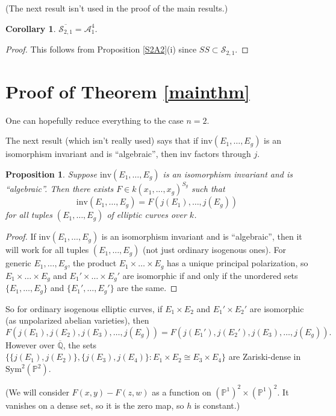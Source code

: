 \documentclass{amsart}
\def\Q{\mathbb{Q}}
\def\SS{{\mathcal S}}
\def\P{\mathbb{P}}
\def\AA{{\mathcal A}}
\def\Sym{\mathrm{Sym}}
\def\invar{\mathrm{inv}}
\numberwithin{equation}{section}
\newtheorem{cor}[thm]{Corollary}
\newtheorem{prop}[thm]{Proposition}
\theoremstyle{definition}
\begin{document}
(The next result isn't used in the proof of the main results.)

\begin{cor}
\label{SS21A14}
$\overline{\SS_{2,1}} = \AA_1^4$.
\end{cor}

\begin{proof}
This follows from Proposition \ref{S2A2}(i) since $SS \subset \SS_{2,1}$.
\end{proof}


\section{Proof of Theorem \ref{mainthm}}


One can hopefully reduce everything to the case $n=2$.

The next result (which isn't really used) says that if $\invar(E_1,\ldots,E_g)$ is an isomorphism invariant and is ``algebraic'', then $\invar$ factors through $j$.

\begin{prop}
Suppose $\invar(E_1,\ldots,E_g)$ is an isomorphism invariant and is ``algebraic''. Then there exists $F \in k(x_1,...,x_g)^{S_g}$ such that
$$
\invar(E_1,\ldots,E_g) = F(j(E_1),\ldots,j(E_g))
$$
for {\em all} tuples $(E_1,\ldots,E_g)$ of elliptic curves over $k$.
\end{prop}

\begin{proof}
If $\invar(E_1,\ldots,E_g)$ is an isomorphism invariant and is ``algebraic'', then it will work for all tuples $(E_1,\ldots,E_g)$ (not just ordinary isogenous ones). For generic $E_1,\ldots,E_g$, the product $E_1\times \ldots\times E_g$ has a unique principal polarization, so $E_1\times \ldots\times E_g$ and $E_1'\times \ldots\times E_g'$ are isomorphic if and only if the unordered sets $\{ E_1,\ldots,E_g\}$ and $\{ E_1',\ldots,E_g'\}$ are the same.
\end{proof}

So for ordinary isogenous elliptic curves, if $E_1\times E_2$ and $E_1'\times E_2'$ are isomorphic (as unpolarized abelian varieties), then 
$$
F(j(E_1),j(E_2),j(E_3),\ldots,j(E_g)) = F(j(E_1'),j(E_2'),j(E_3),\ldots,j(E_g)).
$$
However over $\overline{\Q}$, the sets $\{ \{ j(E_1),j(E_2)\},\{j(E_3),j(E_4)\} : E_1\times E_2 \cong E_3\times E_4 \}$
are Zariski-dense in $\Sym^2(\P^2)$.

(We will consider $F(x,y)-F(z,w)$ as a function on $(\P^1)^2 \times (\P^1)^2$. It vanishes on a dense set, so it is the zero map, so $h$ is constant.)
\end{document}
